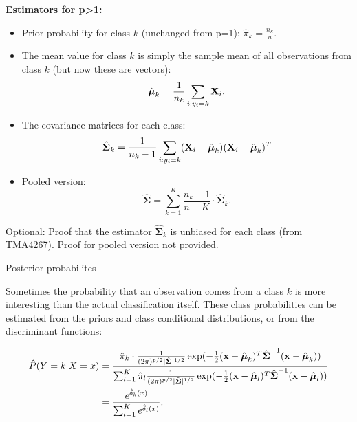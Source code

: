 \documentclass[10pt,ignorenonframetext,]{beamer}
\begin{document}
\begin{frame}

\textbf{Estimators for p\textgreater{}1:}

\begin{itemize}
\item
  Prior probability for class \(k\) (unchanged from p=1):
  \(\hat{\pi}_k = \frac{n_k}{n}.\)
\item
  The mean value for class \(k\) is simply the sample mean of all
  observations from class \(k\) (but now these are vectors):
  \[\hat{\boldsymbol{\mu}}_k = \frac{1}{n_k}\sum_{i:y_i=k} {\bf X}_i.\]
\item
  The covariance matrices for each class:
  \[\hat{\boldsymbol{\Sigma}}_k=\frac{1}{n_k-1}\sum_{i:y_i=k} ({\bf X}_i-\hat{\boldsymbol{\mu}}_k ) ({\bf X}_i-\hat{\boldsymbol{\mu}}_k)^T\]
\item
  Pooled version:
  \[\hat{\boldsymbol{\Sigma}}= \sum_{k=1}^K \frac{n_k - 1}{n - K} \cdot \hat{\boldsymbol{\Sigma}}_k.\]
\end{itemize}

Optional:
\href{https://www.math.ntnu.no/emner/TMA4268/2018v/notes/ProofMeanS.pdf}{Proof
that the estimator \(\hat{\boldsymbol{\Sigma}}_k\) is unbiased for each
class (from TMA4267)}. Proof for pooled version not provided.

\end{frame}

\begin{frame}

\begin{block}{Posterior probabilites}

Sometimes the probability that an observation comes from a class \(k\)
is more interesting than the actual classification itself. These class
probabilities can be estimated from the priors and class conditional
distributions, or from the discriminant functions:

\begin{align*}\hat{P}(Y=k | X=x)&=
\frac{\hat{\pi}_k \cdot \frac{1}{(2 \pi)^{p/2}|\hat{\boldsymbol{\Sigma}}|^{1/2}} \exp(-\frac{1}{2}
({\bf x}-\hat{\boldsymbol\mu}_k)^T \hat{\boldsymbol{\Sigma}}^{-1}
({\bf x}-\hat{\boldsymbol\mu}_k))}
{\sum_{l=1}^K \hat{\pi}_l 
\frac{1}{(2 \pi)^{p/2}|\hat{\boldsymbol{\Sigma}}|^{1/2}}
\exp(-\frac{1}{2}
({\bf x}-\hat{\boldsymbol\mu}_l)^T 
\hat{\boldsymbol{\Sigma}}^{-1}
({\bf x}-\hat{\boldsymbol\mu}_l))}\\
&=
\frac{e^{\hat{\delta}_k(x)}}{\sum_{l=1}^K e^{\hat{\delta}_l(x)}}.\end{align*}

\end{block}

\end{frame}
\end{document}
